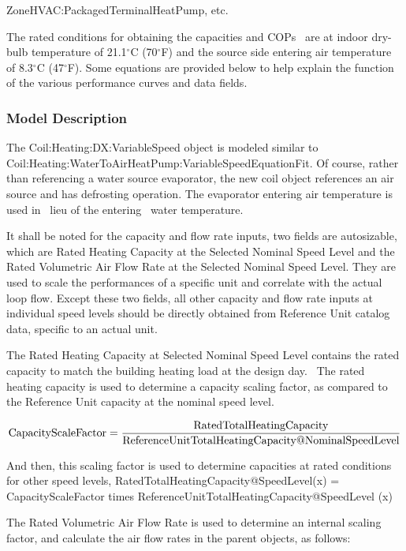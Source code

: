 ZoneHVAC:PackagedTerminalHeatPump, etc.

The rated conditions for obtaining the capacities and COPs~ are at indoor dry-bulb temperature of 21.1\(^{\circ}\)C (70\(^{\circ}\)F) and the source side entering air temperature of 8.3\(^{\circ}\)C (47\(^{\circ}\)F). Some equations are provided below to help explain the function of the various performance curves and data fields.

\subsubsection{Model Description}\label{model-description-5}

The Coil:Heating:DX:VariableSpeed object is modeled similar to \\ Coil:Heating:WaterToAirHeatPump:VariableSpeedEquationFit. Of course, rather than referencing a water source evaporator, the new coil object references an air source and has defrosting operation. The evaporator entering air temperature is used in~ lieu of the entering~ water temperature.

It shall be noted for the capacity and flow rate inputs, two fields are autosizable, which are Rated Heating Capacity at the Selected Nominal Speed Level and the Rated Volumetric Air Flow Rate at the Selected Nominal Speed Level. They are used to scale the performances of a specific unit and correlate with the actual loop flow. Except these two fields, all other capacity and flow rate inputs at individual speed levels should be directly obtained from Reference Unit catalog data, specific to an actual unit.

The Rated Heating Capacity at Selected Nominal Speed Level contains the rated capacity to match the building heating load at the design day.~ The rated heating capacity is used to determine a capacity scaling factor, as compared to the Reference Unit capacity at the nominal speed level.

\begin{equation}
{\rm{CapacityScaleFactor}} = \frac{{{\rm{RatedTotalHeatingCapacity}}}}{{{\rm{ReferenceUnitTotalHeatingCapacity}}@{\rm{NominalSpeedLevel}}}}
\end{equation}

And then, this scaling factor is used to determine capacities at rated conditions for other speed levels, RatedTotalHeatingCapacity@SpeedLevel(x) = CapacityScaleFactor times ReferenceUnitTotalHeatingCapacity@SpeedLevel (x)

The Rated Volumetric Air Flow Rate is used to determine an internal scaling factor, and calculate the air flow rates in the parent objects, as follows:

